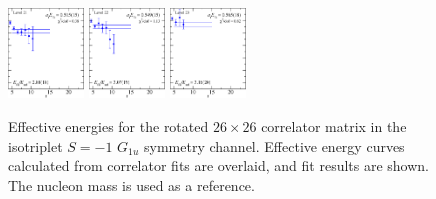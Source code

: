 \begin{figure}[H]
    \includegraphics[width=0.18\textwidth]{figures/sigmas/g1u/fits/fit_19.pdf}
    \includegraphics[width=0.18\textwidth]{figures/sigmas/g1u/fits/fit_21.pdf}
    \includegraphics[width=0.18\textwidth]{figures/sigmas/g1u/fits/fit_23.pdf}
    \caption[Effective energies for the rotated $26\times 26$ correlator matrix in the isotriplet $S=-1$ $G_{1u}$ symmetry channel.]{Effective energies for the rotated $26\times 26$ correlator matrix in the isotriplet $S=-1$ $G_{1u}$ symmetry channel. Effective energy curves calculated from correlator fits are overlaid, and fit results are shown. The nucleon mass is used as a reference.}\label{fig:g1u_fits}
\end{figure}

